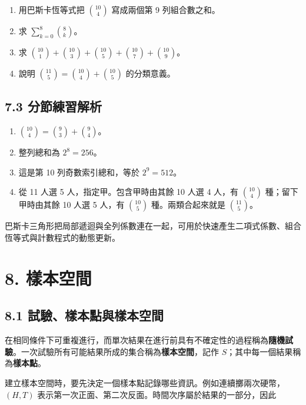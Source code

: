 \documentclass[11pt,a4paper]{article}
\providecommand{\tightlist}{%
  \setlength{\itemsep}{0pt}\setlength{\parskip}{0pt}}
\begin{document}
\begin{enumerate}
\def\labelenumi{\arabic{enumi}.}
\tightlist
\item
  用巴斯卡恆等式把 \(\binom{10}{4}\) 寫成兩個第 9 列組合數之和。
\item
  求 \(\displaystyle\sum_{k=0}^{8}\binom8k\)。
\item
  求 \(\binom{10}{1}+\binom{10}{3}+\binom{10}{5}+\binom{10}{7}+\binom{10}{9}\)。
\item
  說明 \(\binom{11}{5}=\binom{10}{4}+\binom{10}{5}\) 的分類意義。
\end{enumerate}

\subsection{7.3 分節練習解析}\label{ux5206ux7bc0ux7df4ux7fd2ux89e3ux6790-6}

\begin{enumerate}
\def\labelenumi{\arabic{enumi}.}
\tightlist
\item
  \(\binom{10}{4}=\binom93+\binom94\)。
\item
  整列總和為 \(2^8=256\)。
\item
  這是第 10 列奇數索引總和，等於 \(2^9=512\)。
\item
  從 11 人選 5 人，指定甲。包含甲時由其餘 10 人選 4 人，有 \(\binom{10}{4}\) 種；留下甲時由其餘 10 人選 5 人，有 \(\binom{10}{5}\) 種。兩類合起來就是 \(\binom{11}{5}\)。
\end{enumerate}

巴斯卡三角形把局部遞迴與全列係數連在一起，可用於快速產生二項式係數、組合恆等式與計數程式的動態更新。

\section{8. 樣本空間}\label{ux6a23ux672cux7a7aux9593}

\subsection{8.1 試驗、樣本點與樣本空間}\label{ux8a66ux9a57ux6a23ux672cux9edeux8207ux6a23ux672cux7a7aux9593}

在相同條件下可重複進行，而單次結果在進行前具有不確定性的過程稱為\textbf{隨機試驗}。一次試驗所有可能結果所成的集合稱為\textbf{樣本空間}，記作 \(S\)；其中每一個結果稱為\textbf{樣本點}。

建立樣本空間時，要先決定一個樣本點記錄哪些資訊。例如連續擲兩次硬幣，\((H,T)\) 表示第一次正面、第二次反面。時間次序屬於結果的一部分，因此
\end{document}
